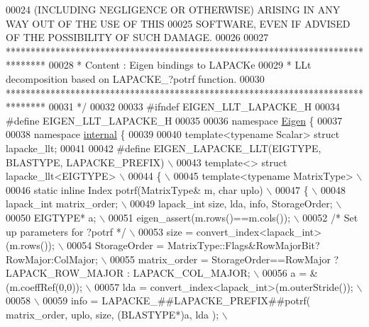 \begin{DoxyCode}
00024 \textcolor{comment}{ (INCLUDING NEGLIGENCE OR OTHERWISE) ARISING IN ANY WAY OUT OF THE USE OF THIS}
00025 \textcolor{comment}{ SOFTWARE, EVEN IF ADVISED OF THE POSSIBILITY OF SUCH DAMAGE.}
00026 \textcolor{comment}{}
00027 \textcolor{comment}{ ********************************************************************************}
00028 \textcolor{comment}{ *   Content : Eigen bindings to LAPACKe}
00029 \textcolor{comment}{ *     LLt decomposition based on LAPACKE\_?potrf function.}
00030 \textcolor{comment}{ ********************************************************************************}
00031 \textcolor{comment}{*/}
00032 
00033 \textcolor{preprocessor}{#ifndef EIGEN\_LLT\_LAPACKE\_H}
00034 \textcolor{preprocessor}{#define EIGEN\_LLT\_LAPACKE\_H}
00035 
00036 \textcolor{keyword}{namespace }\hyperlink{namespace_eigen}{Eigen} \{ 
00037 
00038 \textcolor{keyword}{namespace }\hyperlink{namespaceinternal}{internal} \{
00039 
00040 \textcolor{keyword}{template}<\textcolor{keyword}{typename} Scalar> \textcolor{keyword}{struct }lapacke\_llt;
00041 
00042 \textcolor{preprocessor}{#define EIGEN\_LAPACKE\_LLT(EIGTYPE, BLASTYPE, LAPACKE\_PREFIX) \(\backslash\)}
00043 \textcolor{preprocessor}{template<> struct lapacke\_llt<EIGTYPE> \(\backslash\)}
00044 \textcolor{preprocessor}{\{ \(\backslash\)}
00045 \textcolor{preprocessor}{  template<typename MatrixType> \(\backslash\)}
00046 \textcolor{preprocessor}{  static inline Index potrf(MatrixType& m, char uplo) \(\backslash\)}
00047 \textcolor{preprocessor}{  \{ \(\backslash\)}
00048 \textcolor{preprocessor}{    lapack\_int matrix\_order; \(\backslash\)}
00049 \textcolor{preprocessor}{    lapack\_int size, lda, info, StorageOrder; \(\backslash\)}
00050 \textcolor{preprocessor}{    EIGTYPE* a; \(\backslash\)}
00051 \textcolor{preprocessor}{    eigen\_assert(m.rows()==m.cols()); \(\backslash\)}
00052 \textcolor{preprocessor}{    }\textcolor{comment}{/* Set up parameters for ?potrf */}\textcolor{preprocessor}{ \(\backslash\)}
00053 \textcolor{preprocessor}{    size = convert\_index<lapack\_int>(m.rows()); \(\backslash\)}
00054 \textcolor{preprocessor}{    StorageOrder = MatrixType::Flags&RowMajorBit?RowMajor:ColMajor; \(\backslash\)}
00055 \textcolor{preprocessor}{    matrix\_order = StorageOrder==RowMajor ? LAPACK\_ROW\_MAJOR : LAPACK\_COL\_MAJOR; \(\backslash\)}
00056 \textcolor{preprocessor}{    a = &(m.coeffRef(0,0)); \(\backslash\)}
00057 \textcolor{preprocessor}{    lda = convert\_index<lapack\_int>(m.outerStride()); \(\backslash\)}
00058 \textcolor{preprocessor}{\(\backslash\)}
00059 \textcolor{preprocessor}{    info = LAPACKE\_##LAPACKE\_PREFIX##potrf( matrix\_order, uplo, size, (BLASTYPE*)a, lda ); \(\backslash\)}

\end{DoxyCode}
